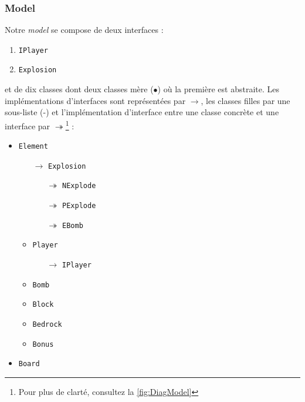        
        \subsubsection{Model}
        Notre \textit{model} se compose de deux interfaces :
  		\begin{multicols}{2}
        \begin{enumerate}
            \item \texttt{IPlayer}
            \item \texttt{Explosion}
        \end{enumerate}
	    \end{multicols}
	    et de dix classes dont deux classes mère ($\bullet$) où la première est 
	    abstraite. Les implémentations d'interfaces sont représentées par $\rightarrow$, 
	    les classes filles par une sous-liste (-) et l'implémentation d'interface entre
        une classe concrète et une interface par $\twoheadrightarrow$\footnote{Pour 
        plus de clarté, consultez la \autoref{fig:DiagModel}} :
	    \begin{multicols}{2}
        \begin{itemize}

            \item \texttt{Element}
            \begin{itemize}
            \item[$\rightarrow$] \texttt{Explosion}
				\begin{itemize}
				\item[$\twoheadrightarrow$] \texttt{NExplode}
				\item[$\twoheadrightarrow$] \texttt{PExplode}
				\item[$\twoheadrightarrow$]	 \texttt{EBomb}			
				\end{itemize}				            
            
            
	        \item \texttt{Player}
	        \begin{itemize}
	        \item[$\rightarrow$]	 \texttt{IPlayer}	
	        \end{itemize}
            \item \texttt{Bomb}
            \item \texttt{Block}
            \item \texttt{Bedrock}
            \item \texttt{Bonus}
            \end{itemize}
            \item \texttt{Board}
        
        \end{itemize}
        \end{multicols}
        
